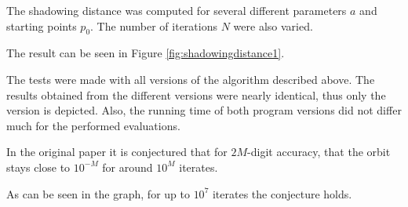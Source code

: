   The shadowing distance was computed for several different parameters $a$ and starting points $p_0$. 
  The number of iterations $N$ were also varied. 

  The result can be seen in Figure \ref{fig:shadowingdistance1}. 
  
  The tests were made with all versions of the algorithm described above.
  The results obtained from the different versions were nearly identical, thus
  only the \irram version is depicted.
  Also, the running time of both program versions did not differ much for
  the performed  evaluations.

  In the original paper it is conjectured that for $2M$-digit
  accuracy, that the orbit stays close to $10^{-M}$ for around $10^M$ iterates.

  As can be seen in the graph, for up to $10^7$ iterates the conjecture holds. 
